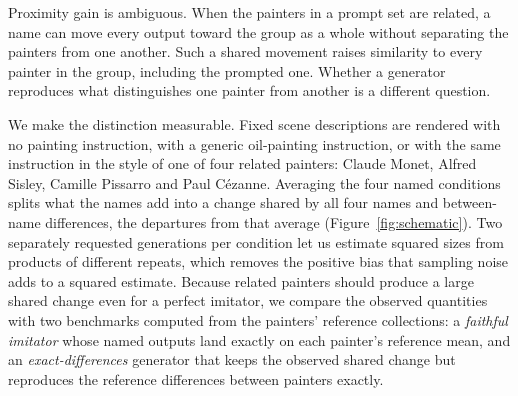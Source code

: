 \documentclass[10pt]{article}
\begin{document}
Proximity gain is ambiguous. When the painters in a prompt set are related, a name can move
every output toward the group as a whole without separating the painters from one another.
Such a shared movement raises similarity to every painter in the group, including the prompted
one. Whether a generator reproduces what distinguishes one painter from another is a different
question.

We make the distinction measurable. Fixed scene descriptions are rendered with no painting
instruction, with a generic oil-painting instruction, or with the same instruction in the style
of one of four related painters: Claude Monet, Alfred Sisley, Camille Pissarro and Paul
C\'ezanne. Averaging the four named conditions splits what the names add into a change shared
by all four names and between-name differences, the departures from that average
(Figure~\ref{fig:schematic}). Two separately requested generations per condition let us
estimate squared sizes from products of different repeats, which removes the positive bias that
sampling noise adds to a squared estimate. Because related painters should produce a large
shared change even for a perfect imitator, we compare the observed quantities with two
benchmarks computed from the painters' reference collections: a \emph{faithful imitator} whose
named outputs land exactly on each painter's reference mean, and an \emph{exact-differences}
generator that keeps the observed shared change but reproduces the reference differences
between painters exactly.
\end{document}
